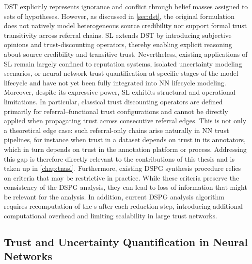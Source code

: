 \ac{DST} explicitly represents ignorance and conflict through belief masses assigned to sets of hypotheses. However, as discussed in \cref{sec:dst}, the original formulation does not natively model heterogeneous source credibility nor support formal trust transitivity across referral chains. \ac{SL} extends \ac{DST} by introducing subjective opinions and trust-discounting operators, thereby enabling explicit reasoning about source credibility and transitive trust. Nevertheless, existing applications of \ac{SL} remain largely confined to reputation systems, isolated uncertainty modeling scenarios, or neural network trust quantification at specific stages of the model lifecycle and have not yet been fully integrated into \ac{NN} lifecycle modeling. Moreover, despite its expressive power, \ac{SL} exhibits structural and operational limitations. In particular, classical trust discounting operators are defined primarily for referral–functional trust configurations and cannot be directly applied when propagating trust across consecutive referral edges. This is not only a theoretical edge case: such referral-only chains arise naturally in \ac{NN} trust pipelines, for instance when trust in a dataset depends on trust in its annotators, which in turn depends on trust in the annotation platform or process. Addressing this gap is therefore directly relevant to the contributions of this thesis and is taken up in \cref{chap:tnasl}. Furthermore, existing \ac{DSPG} synthesis procedure relies on criteria that may be restrictive in practice. While these criteria preserve the consistency of the \ac{DSPG} analysis, they can lead to loss of information that might be relevant for the analysis. In addition, current \ac{DSPG} analysis algorithm requires recomputation of the s after each reduction step, introducing additional computational overhead and limiting scalability in large trust networks. 
\subsection*{Trust and Uncertainty Quantification in Neural Networks}

